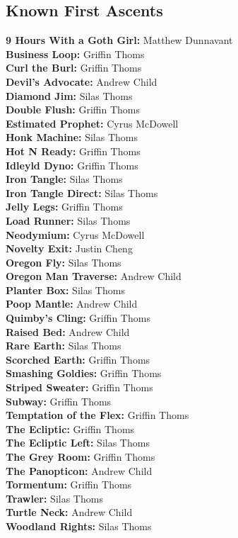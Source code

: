 \begin{flushleft}
\section{Known First Ascents}
\textbf{9 Hours With a Goth Girl:} Matthew Dunnavant\\
\textbf{Business Loop:} Griffin Thoms\\
\textbf{Curl the Burl:} Griffin Thoms\\
\textbf{Devil's Advocate:} Andrew Child\\
\textbf{Diamond Jim:} Silas Thoms\\
\textbf{Double Flush:} Griffin Thoms\\
\textbf{Estimated Prophet:} Cyrus McDowell\\
\textbf{Honk Machine:} Silas Thoms\\
\textbf{Hot N Ready:} Griffin Thoms\\
\textbf{Idleyld Dyno:} Griffin Thoms\\
\textbf{Iron Tangle:} Silas Thoms\\
\textbf{Iron Tangle Direct:} Silas Thoms\\
\textbf{Jelly Legs:} Griffin Thoms\\
\textbf{Load Runner:} Silas Thoms\\
\textbf{Neodymium:} Cyrus McDowell\\
\textbf{Novelty Exit:} Justin Cheng\\
\textbf{Oregon Fly:} Silas Thoms\\
\textbf{Oregon Man Traverse:} Andrew Child\\
\textbf{Planter Box:} Silas Thoms\\
\textbf{Poop Mantle:} Andrew Child\\
\textbf{Quimby's Cling:} Griffin Thoms\\
\textbf{Raised Bed:} Andrew Child\\
\textbf{Rare Earth:} Silas Thoms\\
\textbf{Scorched Earth:} Griffin Thoms\\
\textbf{Smashing Goldies:} Griffin Thoms\\
\textbf{Striped Sweater:} Griffin Thoms\\
\textbf{Subway:} Griffin Thoms\\
\textbf{Temptation of the Flex:} Griffin Thoms\\
\textbf{The Ecliptic:} Griffin Thoms\\
\textbf{The Ecliptic Left:} Silas Thoms\\
\textbf{The Grey Room:} Griffin Thoms\\
\textbf{The Panopticon:} Andrew Child\\
\textbf{Tormentum:} Griffin Thoms\\
\textbf{Trawler:} Silas Thoms\\
\textbf{Turtle Neck:} Andrew Child\\
\textbf{Woodland Rights:} Silas Thoms\\
\end{flushleft}
\onecolumn
\clearpage